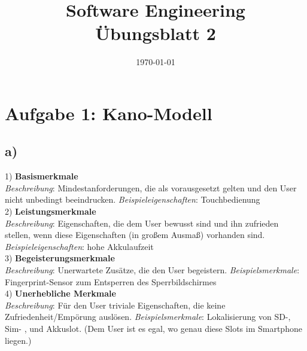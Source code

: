 \documentclass[12pt,pdftex,a4paper]{article}
\title{\vspace{-1cm} Software Engineering \\ Übungsblatt 2}
\date{\today}
\begin{document}
\setlength{\parindent}{0pt}
\maketitle
\thispagestyle{fancy}




\section*{Aufgabe 1: Kano-Modell}

\subsection*{a) }
1) \textbf{Basismerkmale} \\
\textit{Beschreibung}: Mindestanforderungen, die als vorausgesetzt gelten und den User nicht unbedingt beeindrucken.\newline
\textit{Beispieleigenschaften}: Touchbedienung\\

2) \textbf{Leistungsmerkmale}\\
\textit{Beschreibung}: Eigenschaften, die dem User bewusst sind und ihn zufrieden stellen, wenn diese Eigenschaften (in großem Ausmaß) vorhanden sind. \newline
\textit{Beispieleigenschaften}: hohe Akkulaufzeit\\

3) \textbf{Begeisterungsmerkmale}\\
\textit{Beschreibung}: Unerwartete Zusätze, die den User begeistern.\newline
\textit{Beispielsmerkmale}: Fingerprint-Sensor zum Entsperren des Sperrbildschirmes\\

4) \textbf{Unerhebliche Merkmale}\\
\textit{Beschreibung}: Für den User triviale Eigenschaften, die keine Zufriedenheit/Empörung auslösen.\newline
\textit{Beispielsmerkmale}: Lokalisierung von SD-, Sim- , und Akkuslot. (Dem User ist es egal, wo genau diese Slots im Smartphone liegen.)\\
\end{document}
